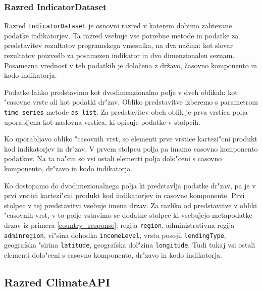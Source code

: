 \subsubsection{Razred IndicatorDataset}

Razred \verb|IndicatorDataset| je osnovni razred v katerem dobimo zahtevane 
podatke indikatorjev. Ta razred vsebuje vse potrebne metode in podatke za 
predstavitev rezultatov programskega vmesnika, na dva načina: kot slovar
rezultatov poizvedb za posamezen indikator in dvo dimenzionalen seznam. 
Posamezna vrednost v teh podatkih je določena z državo, časovno komponento in 
kodo indikatorja. 

Podatke lahko predstavimo kot dvodimenzionalno polje v dveh oblikah: kot
"casovne vrste ali kot podatki dr"zav. Obliko predstavitve izberemo s
parametrom \verb|time_series| metode \verb|as_list|. Za predstavitev obeh oblik
je prva vrstica polja uporabljena kot naslovna vrstica, ki opisuje podatke v 
stolpcih.

Ko uporabljavo obliko "casovnih vrst, so elementi prve vrstice kartezi"cni
produkt kod indikatorjev in dr"zav. V prvem stolpcu polja pa imamo casovno
komponento podatkov. Na ta na"cin so vsi ostali elementi polja dolo"ceni s 
casovno komponento, dr"zavo in kodo indikatorja.

Ko dostopamo do dvodimezionalnega polja ki predstavlja podatke dr"zav, pa je v
prvi vrstici kartezi"cni produkt kod indikatorjev in casovne komponente. Prvi
stolpec v tej predstavitvi vsebuje imena drzav. Za razliko od predstavitve v 
obliki "casovnih vrst, v to polje vstavimo se dodatne stolpce ki vsebujejo
metapodatke drzav iz primera \ref{country_response}: regija \verb|region|, administrativna regija
\verb|adminregion|, vi"sina dohodka \verb|incomeLevel|, vrsta posojil
\verb|lendingType|, geografska "sirina \verb|latitude|, geografska dol"zina
\verb|longitude|. Tudi tukaj vsi ostali elementi dolo"ceni s casovno 
komponento, dr"zavo in kodo indikatorja. 

% 
% 
% 


\subsection{Razred ClimateAPI}

